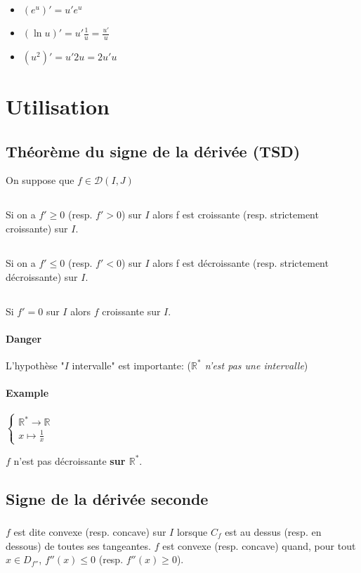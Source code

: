 \documentclass{article}
\newcommand{\R}{\mathbb{R}}
\begin{document}
\begin{itemize}
	\item $\left( e^{u} \right)' = u'e^u$
	\item $(\ln u)' = u'\frac{1}{u} = \frac{u'}{u}$
	\item $\left( u^2 \right)' = u'2u = 2u'u$
\end{itemize}

\section{Utilisation}
\subsection{Théorème du signe de la dérivée (TSD)}
On suppose que $f \in \mathcal{D}(I, J)$

\subsection{}
Si on a $f'\ge 0$ (resp. $f'>0$) sur $I$ alors f est croissante (resp. strictement croissante) sur $I$.

\subsection{}
Si on a $f'\le 0$ (resp. $f'<0$) sur $I$ alors f est décroissante (resp. strictement décroissante) sur $I$.

\subsection{}
Si $f'=0$ sur $I$ alors $f$ croissante sur $I$.

\paragraph{Danger}
L'hypothèse "$I$ intervalle" est importante: (\emph{$\R^\ast$ n'est pas une intervalle})

\paragraph{Example}
$\begin{cases}
	\R^\ast \to \R\\
	x\mapsto \frac{1}{x}
\end{cases}$

$f$ n'est pas décroissante \textbf{sur $\R^\ast$}.

\subsection{Signe de la dérivée seconde}
\subsubsection{}
$f$ est dite convexe (resp. concave) sur $I$ lorsque $C_f$ est au dessus (resp. en dessous) de toutes ses tangeantes.
$f$ est convexe (resp. concave) quand, pour tout $x \in D_{f''}$, $f''(x) \le 0$ (resp. $f''(x) \ge 0$).
\end{document}
